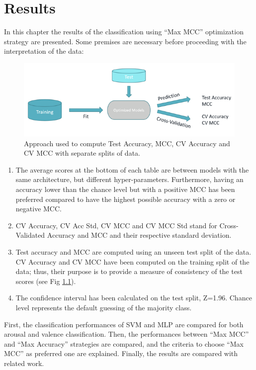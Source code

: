 \chapter{Results}
\label{chap:results}
In this chapter the results of the classification using “Max MCC” optimization strategy are presented. Some premises are necessary before proceeding with the interpretation of the data:

\begin{figure}[h!]
\includegraphics[width=12cm]{img/methods/data_split_strategy.png}
\centering
\caption{Approach used to compute Test Accuracy, MCC, CV Accuracy and CV MCC with separate splits of data.} \label{fig_data_split_strategy}
\end{figure}

\begin{enumerate}
\item 	The average scores at the bottom of each table are between models with the same architecture, but different hyper-parameters. Furthermore, having an accuracy lower than the chance level but with a positive \ac{MCC} has been preferred compared to have the highest possible accuracy with a zero or negative \ac{MCC}.
\item 	CV Accuracy, CV Acc Std, \ac{CV MCC} and CV MCC Std stand for Cross-Validated Accuracy and MCC and their respective standard deviation.
\item 	Test accuracy and \ac{MCC} are computed using an unseen test split of the data. CV Accuracy and \ac{CV MCC} have been computed on the training split of the data; thus, their purpose is to provide a measure of consistency of the test scores (see Fig \ref{fig_data_split_strategy}).
\item 	The confidence interval has been calculated on the test split, Z=1.96. Chance level represents the default guessing of the majority class.
\end{enumerate}

First, the classification performances of \ac{SVM} and \ac{MLP} are compared for both arousal and valence classification. Then, the performances between “Max MCC” and “Max Accuracy” strategies are compared, and the criteria to choose “Max MCC” as preferred one are explained. Finally, the results are compared with related work.

